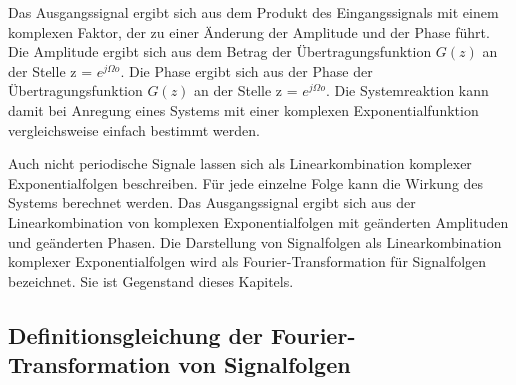 Das Ausgangssignal ergibt sich aus dem Produkt des Eingangssignals mit einem komplexen Faktor, der zu einer Änderung der Amplitude und der Phase führt. Die Amplitude ergibt sich aus dem Betrag der Übertragungsfunktion \(G(z)\) an der Stelle z = \(e^{jΩo}\). Die Phase ergibt sich aus der Phase der Übertragungsfunktion \(G(z)\) an der Stelle z = \(e^{jΩo}\). Die Systemreaktion kann damit bei Anregung eines Systems mit einer komplexen Exponentialfunktion vergleichsweise einfach bestimmt werden.

Auch nicht periodische Signale lassen sich als Linearkombination komplexer Exponentialfolgen beschreiben. Für jede einzelne Folge kann die Wirkung des Systems berechnet werden. Das Ausgangssignal ergibt sich aus der Linearkombination von komplexen Exponentialfolgen mit geänderten Amplituden und geänderten Phasen. Die Darstellung von Signalfolgen als Linearkombination komplexer Exponentialfolgen wird als Fourier-Transformation für Signalfolgen bezeichnet. Sie ist Gegenstand dieses Kapitels.

\subsection{Definitionsgleichung der Fourier-Transformation von Signalfolgen}\label{sec:7.1.2}

